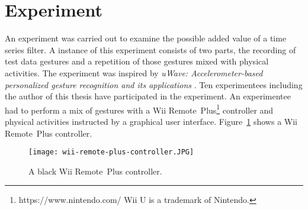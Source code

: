 \section{Experiment} \label{experiment}
An experiment was carried out to examine the possible added value of a time series filter. A instance of this experiment
consists of two parts, the recording of test data gestures and a repetition of those gestures mixed with physical
activities. The experiment was inspired by
\textit{uWave: Accelerometer-based personalized gesture recognition and its applications} \cite{liu2009uwave}. Ten
experimentees including the author of this thesis have participated in the experiment. An experimentee had to perform a
mix of gestures with a Wii
Remote\texttrademark~Plus\footnote{https://www.nintendo.com/ Wii U is a trademark of Nintendo.} controller and physical
activities instructed by a graphical user interface. Figure~\ref{fig:wii-remote} shows a Wii Remote\texttrademark~Plus
controller.
\begin{figure}
    \begin{center}
        \texttt{[image: wii-remote-plus-controller.JPG]}
    \end{center}
    \caption{A black Wii Remote\texttrademark~Plus controller.}
    \label{fig:wii-remote}
\end{figure}



